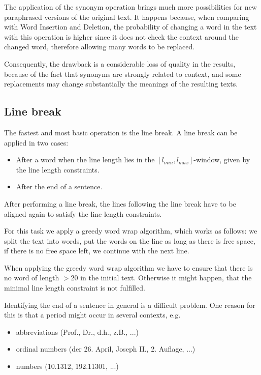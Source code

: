 \documentclass[11pt]{reportAlternative}
\begin{document}
The application of the synonym operation brings much more possibilities for new paraphrased versions of the original text. It happens because, when comparing with Word Insertion and Deletion, the probability of changing a word in the text with this operation is higher since it does not check the context around the changed word, therefore allowing many words to be replaced.

Consequently, the drawback is a considerable loss of quality in the results, because of the fact that synonyms are strongly related to context, and some replacements may change substantially the meanings of the resulting texts.

\subsection{Line break}
The fastest and most basic operation is the line break. A line break can be applied in two cases:

\begin{itemize}
	\item After a word when the line length lies in the $[l_{min},l_{max}]$-window,
	given by the line length constraints.
	\item After the end of a sentence.
\end{itemize}
After performing a line break, the lines following the line break have
to be aligned again to satisfy the line length constraints.

For this task we apply a greedy word wrap algorithm, which works as follows: we split the text into words,
put the words on the line as long as there is free space, if there is no free space left, we continue with the next line.

When applying the greedy word wrap algorithm we have to ensure that
there is no word of length $> 20$ in the initial text. Otherwise it might happen, that the minimal line
length constraint is not fulfilled.

Identifying the end of a sentence in general is a difficult problem. One reason for this is that a period
might occur in several contexts, e.g.

\begin{itemize}

	\item abbreviations (Prof., Dr., d.h., z.B., ...)
	\item ordinal numbers (der 26. April, Joseph II., 2. Auflage, ...)
	\item numbers (10.1312, 192.11301, ...)

\end{itemize}
\end{document}
